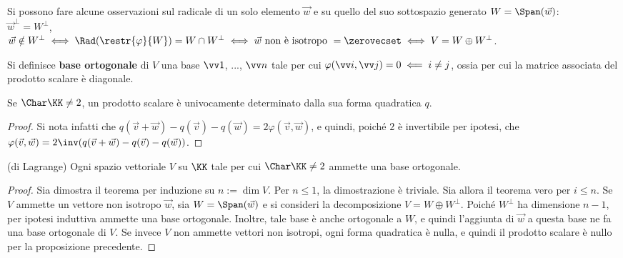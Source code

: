 \documentclass[11pt]{article}
\begin{document}
	\begin{remark}
		Si possono fare alcune osservazioni sul radicale di un solo elemento $\vec w$ e su quello del suo sottospazio
		generato $W = \Span(\vec w)$: \\
		
		\li $\vec w ^\perp = W^\perp$, \\
		\li $\vec w \notin W^\perp \iff \Rad (\restr{\varphi}{W}) = W \cap W^\perp \iff \vec w \text{ non è isotropo } = \zerovecset \iff
		V = W \oplus W^\perp$.
	\end{remark}

	\begin{definition}
		Si definisce \textbf{base ortogonale} di $V$ una base $\vv 1$, ..., $\vv n$ tale per cui $\varphi(\vv i, \vv j) = 0
		\impliedby i \neq j$, ossia per cui la matrice associata del prodotto scalare è diagonale. 
	\end{definition}

	\begin{proposition}
		Se $\Char \KK \neq 2$, un prodotto scalare è univocamente determinato dalla sua forma quadratica $q$.
	\end{proposition}

	\begin{proof}
		Si nota infatti che $q(\vec v + \vec w) - q(\vec v) - q(\vec w) = 2 \varphi(\vec v, \vec w)$, e quindi,
		poiché $2$ è invertibile per ipotesi, che $\varphi(\vec v, \vec w) = 2\inv (q(\vec v + \vec w) - q(\vec v) - q(\vec w))$.
	\end{proof}

	\begin{theorem}(di Lagrange)
		Ogni spazio vettoriale $V$ su $\KK$ tale per cui $\Char \KK \neq 2$ ammette una base ortogonale.
	\end{theorem}

	\begin{proof}
		Sia dimostra il teorema per induzione su $n := \dim V$. Per $n \leq 1$, la dimostrazione è triviale. Sia
		allora il teorema vero per $i \leq n$. Se $V$ ammette un vettore non isotropo $\vec w$, sia $W = \Span(\vec w)$ e si consideri la decomposizione $V = W \oplus W^\perp$. Poiché $W^\perp$ ha dimensione $n-1$, per ipotesi induttiva
		ammette una base ortogonale. Inoltre, tale base è anche ortogonale a $W$, e quindi l'aggiunta di $\vec w$ a
		questa base ne fa una base ortogonale di $V$. Se invece $V$ non ammette vettori non isotropi, ogni forma quadratica
		è nulla, e quindi il prodotto scalare è nullo per la proposizione precedente.
	\end{proof}
\end{document}
